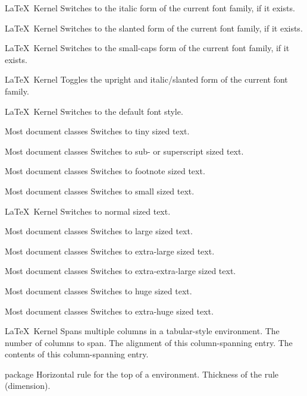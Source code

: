 %
 {}%
 {\LaTeX\ Kernel}%
 {Switches to the italic form of the current font family, if it exists.}%
 {}

%
 {}%
 {\LaTeX\ Kernel}%
 {Switches to the slanted form of the current font family, if it exists.}%
 {}

%
 {}%
 {\LaTeX\ Kernel}%
 {Switches to the small-caps form of the current font family, if it exists.}%
 {}

%
 {}%
 {\LaTeX\ Kernel}%
 {Toggles the upright and italic\slash slanted form of the current font family.}%
 {}

%
 {}%
 {\LaTeX\ Kernel}%
 {Switches to the default font style.}%
 {}

%
 {}%
 {Most document classes}%
 {Switches to tiny sized text.}%
 {}

%
 {}%
 {Most document classes}%
 {Switches to sub- or superscript sized text.}%
 {}

%
 {}%
 {Most document classes}%
 {Switches to footnote sized text.}%
 {}

%
 {}%
 {Most document classes}%
 {Switches to small sized text.}%
 {}

%
 {}%
 {\LaTeX\ Kernel}%
 {Switches to normal sized text.}%
 {%
 }

%
 {}%
 {Most document classes}%
 {Switches to large sized text.}%
 {%
 }

%
 {}%
 {Most document classes}%
 {Switches to extra-large sized text.}%
 {%
 }

%
 {}%
 {Most document classes}%
 {Switches to extra-extra-large sized text.}%
 {%
 }

%
 {}%
 {Most document classes}%
 {Switches to huge sized text.}%
 {%
 }

%
 {}%
 {Most document classes}%
 {Switches to extra-huge sized text.}%
 {%
 }

%
 {}%
 {\LaTeX\ Kernel}%
 {Spans multiple columns in a tabular-style environment.}%
 {%
   \BeginArgList
     The number of columns to span.
     The alignment of this column-spanning entry.
     The contents of this column-spanning entry.
   \EndArgList
 }

%
 {}%
 { package}%
 {Horizontal rule for the top of a  environment.}%
 {%
   \BeginArgList
     Thickness of the rule (dimension).
   \EndArgList
 }

